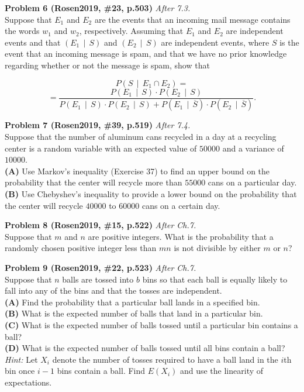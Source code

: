 \documentclass[jou]{apa6}
\begin{document}
\vspace{8pt}
{\bf Problem 6 (Rosen2019, \#23, p.503)} \textendash{} {\em After 7.3.}\\
Suppose that $E_1$ and $E_2$ are the events that an incoming mail message contains the words
$w_1$ and $w_2$, respectively. 
Assuming that $E_1$ and $E_2$ are independent events and that $(E_1 \,\mid\, S)$ 
and $(E_2 \,\mid\, S)$ are independent events, 
where $S$ is the event that an incoming message is spam, and that we have 
no prior knowledge regarding whether or not the message is spam, show that


$$P\left( S \,\mid\, E_1 \cap E_2 \right) =$$
$$= \frac{P(E_1 \,\mid\, S) \cdot P(E_2 \,\mid\, S)}{P(E_1 \,\mid\, S) \cdot P(E_2 \,\mid\, S)
+ P(E_1 \,\mid\, \overline{S} ) \cdot P(E_2 \,\mid\, \overline{S} )}.$$

\vspace{8pt}
{\bf Problem 7 (Rosen2019, \#39, p.519)} \textendash{} {\em After 7.4.}\\
Suppose that the number of aluminum cans recycled in a day at a recycling center
is a random variable with an expected value of $50000$ and a variance of $10000$.\\
{\bf (A)} Use Markov's inequality (Exercise 37) to find an upper bound 
on the probability that the center will recycle more than $55000$ cans on a particular day.\\
{\bf (B)} Use Chebyshev's inequality to provide a lower bound on the probability that the center
will recycle $40000$ to $60000$ cans on a certain day.

\vspace{8pt}
{\bf Problem 8 (Rosen2019, \#15, p.522)} \textendash{} {\em After Ch.7.}\\
Suppose that $m$ and $n$ are positive integers. What is the probability that 
a randomly chosen positive integer less than $mn$ 
is not divisible by either $m$ or $n$? 

\vspace{8pt}
{\bf Problem 9 (Rosen2019, \#22, p.523)} \textendash{} {\em After Ch.7.}\\
Suppose that $n$ balls are tossed into $b$ bins so that each 
ball is equally likely to fall into any of the bins and that the tosses are independent.\\
{\bf (A)} Find the probability that a particular ball lands in a specified bin.\\
{\bf (B)} What is the expected number of balls that land in a particular bin.\\
{\bf (C)} What is the expected number of balls tossed until a particular bin contains a ball?\\
{\bf (D)} What is the expected number of balls tossed until all bins contain a ball?\\
{\em Hint:} Let $X_i$ denote the number of tosses required to have a ball land in 
the $i$th bin once $i-1$ bins contain a ball. Find $E(X_i)$ and use the linearity of 
expectations.
\end{document}
